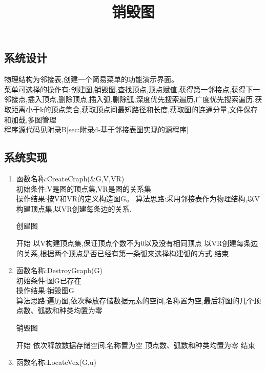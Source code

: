 \documentclass[supercite]{HustGraduPaper}
\theoremstyle{definition}
\begin{document}
\subsection{系统设计}
物理结构为邻接表,创建一个简易菜单的功能演示界面。\\
菜单可选择的操作有:创建图,销毁图,查找顶点,顶点赋值,获得第一邻接点,获得下一邻接点,插入顶点,删除顶点,插入弧,删除弧,深度优先搜索遍历,广度优先搜索遍历,获取距离小于k的顶点集合,获取顶点间最短路径和长度,获取图的连通分量,文件保存和加载,多图管理\\
程序源代码见附录B\ref{sec:附录d-基于邻接表图实现的源程序}
\subsection{系统实现}
\begin{enumerate}
	\renewcommand{\labelenumi}{Code:\theenumi}
	\item 函数名称:CreateCraph(\&G,V,VR)\\
	      初始条件:V是图的顶点集,VR是图的关系集\\
	      操作结果:按V和VR的定义构造图G。
	      算法思路:采用邻接表作为物理结构,以V构建顶点集,以VR创建每条边的关系.
	      \begin{algorithm}[htb]
		      \caption{创建图}
		      \begin{algorithmic}[1]
			      \State 开始
			      \State 以V构建顶点集,保证顶点个数不为0以及没有相同顶点
			      \State 以VR创建每条边的关系,根据两个顶点是否已经有第一条弧来选择构建弧的方式
			      \State 结束
		      \end{algorithmic}\label{G1}
	      \end{algorithm}
	\item 函数名称:DestroyGraph(G)\\
	      初始条件:图G已存在\\
	      操作结果:销毁图G\\
	      算法思路:遍历图,依次释放存储数据元素的空间,名称置为空,最后将图的几个顶点数、弧数和种类均置为零
	      \begin{algorithm}[htb]
		      \title{销毁图}
		      \caption{销毁图}
		      \begin{algorithmic}[1]
			      \State 开始
			      \State 依次释放数据存储空间,名称置为空
			      \State 顶点数、弧数和种类均置为零
			      \State 结束
		      \end{algorithmic}\label{G2}
	      \end{algorithm}
	      \newpage
	\item 函数名称:LocateVex(G,u)

\end{enumerate}
\end{document}
